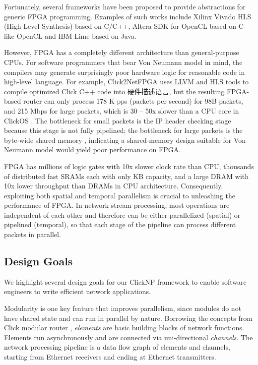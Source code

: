 {Fortunately, several frameworks have been proposed to provide abstractions for generic FPGA programming. Examples of such works include Xilinx Vivado HLS (High Level Synthesis) \cite{feist2012vivado} based on C/C++, Altera SDK for OpenCL \cite{czajkowski2012opencl} based on C-like OpenCL and IBM Lime \cite{auerbach2010lime} based on Java.

However, FPGA has a completely different architecture than general-purpose CPUs. For software programmers that bear Von Neumann model in mind, the compilers may generate surprisingly poor hardware logic for reasonable code in high-level language. For example, Click2NetFPGA \cite{Click2NetFPGA} uses LLVM and HLS tools to compile optimized Click C++ code into 硬件描述语言, but the resulting FPGA-based router can only process 178 K pps (packets per second) for 98B packets, and 215 Mbps for large packets, which is 30 -- 50x slower than a CPU core in ClickOS \cite{martins2014clickos}. The bottleneck for small packets is the IP header checking stage \cite{Click2NetFPGA} because this stage is not fully pipelined; the bottleneck for large packets is the byte-wide shared memory \cite{Click2NetFPGA}, indicating a shared-memory design suitable for Von Neumann model would yield poor performance on FPGA.

FPGA has millions of logic gates with 10x slower clock rate than CPU, thousands of distributed fast SRAMs each with only KB capacity, and a large DRAM with 10x lower throughput than DRAMs in CPU architecture. Consequently, exploiting both spatial and temporal parallelism is crucial to unleashing the performance of FPGA. In network stream processing, most operations are independent of each other and therefore can be either parallelized (spatial) or pipelined (temporal), so that each stage of the pipeline can process different packets in parallel.

\subsection{Design Goals}
\label{clicknp:subsec:designgoals}

We highlight several design goals for our ClickNP framework to enable software engineers to write efficient network applications.

 Modularity is one key feature that improves parallelism, since modules do not have shared state and can run in parallel by nature. Borrowing the concepts from Click modular router \cite{kohler2000click}, \textit{elements} are basic building blocks of network functions. Elements run asynchronously and are connected via uni-directional \textit{channels}. The network processing pipeline is a data flow graph of elements and channels, starting from Ethernet receivers and ending at Ethernet transmitters.

}

